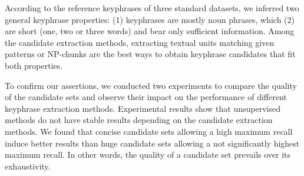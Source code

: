   According to the reference keyphrases of three standard datasets, we inferred
  two general keyphrase properties: (1) keyphrases are mostly noun phrases,
  which (2) are short (one, two or three words) and bear only sufficient
  information. Among the candidate extraction methods, extracting textual units
  matching given patterns or NP-chunks are the best ways to obtain keyphrase
  candidates that fit both properties.

  To confirm our assertions, we conducted two experiments to compare the quality
  of the candidate sets and observe their impact on
  the performance of different keyphrase extraction methods. Experimental
  results show that unsupervised methods do not have stable results depending on
  the candidate extraction methods. We found that concise candidate sets
  allowing a high maximum recall induce better results than huge candidate sets
  allowing a not significantly highest maximum recall. In other words, the
  quality of a candidate set prevails over its exhaustivity.




